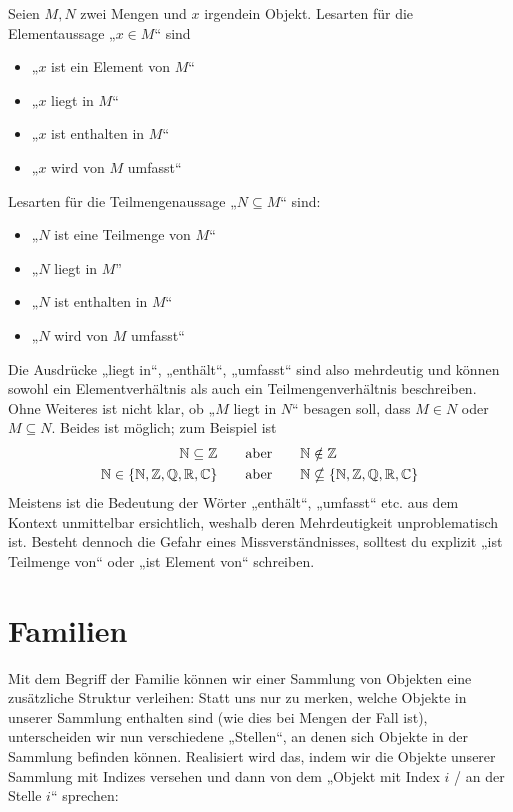 \begin{nota}
    Seien $M,N$ zwei Mengen und $x$ irgendein Objekt. Lesarten für die Elementaussage „$x\in M$“ sind
    \begin{itemize}
        \item „$x$ ist ein Element von $M$“
        \item „$x$ liegt in $M$“
        \item „$x$ ist enthalten in $M$“
        \item „$x$ wird von $M$ umfasst“
    \end{itemize}
    Lesarten für die Teilmengenaussage „$N\subseteq M$“ sind:
    \begin{itemize}
        \item „$N$ ist eine Teilmenge von $M$“
        \item „$N$ liegt in $M$”
        \item „$N$ ist enthalten in $M$“
        \item „$N$ wird von $M$ umfasst“
    \end{itemize}
    Die Ausdrücke „liegt in“, „enthält“, „umfasst“ sind also mehrdeutig und können sowohl ein Elementverhältnis als auch ein Teilmengenverhältnis beschreiben. Ohne Weiteres ist nicht klar, ob „$M$ liegt in $N$“ besagen soll, dass $M\in N$ oder $M\subseteq N$. Beides ist möglich; zum Beispiel ist
    \begin{align*}
        \mathbb N \subseteq \mathbb Z \qquad & \text{aber}\qquad \mathbb N \notin \mathbb Z \\
        \mathbb N \in \{ \mathbb N,\mathbb Z,\mathbb Q,\mathbb R,\mathbb C\} \qquad & \text{aber}\qquad \mathbb N \nsubseteq  \{ \mathbb N,\mathbb Z,\mathbb Q,\mathbb R,\mathbb C\}
    \end{align*}
    Meistens ist die Bedeutung der Wörter „enthält“, „umfasst“ etc. aus dem Kontext unmittelbar ersichtlich, weshalb deren Mehrdeutigkeit unproblematisch ist. Besteht dennoch die Gefahr eines Missverständnisses, solltest du explizit „ist Teilmenge von“ oder „ist Element von“ schreiben.
\end{nota}





\section{Familien}


Mit dem Begriff der Familie können wir einer Sammlung von Objekten eine zusätzliche Struktur verleihen: Statt uns nur zu merken, welche Objekte in unserer Sammlung enthalten sind (wie dies bei Mengen der Fall ist), unterscheiden wir nun verschiedene „Stellen“, an denen sich Objekte in der Sammlung befinden können. Realisiert wird das, indem wir die Objekte unserer Sammlung mit Indizes versehen und dann von dem „Objekt mit Index $i$ / an der Stelle $i$“ sprechen:


